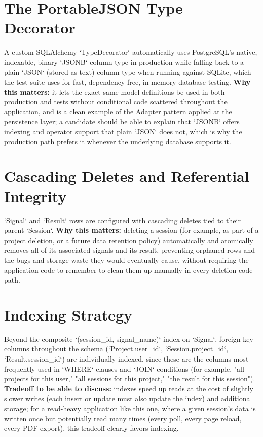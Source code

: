 \documentclass[11pt,a4paper]{report}
\begin{document}
\section{The PortableJSON Type Decorator}

A custom SQLAlchemy `TypeDecorator` automatically uses PostgreSQL's native, indexable, binary `JSONB` column type in production while falling back to a plain `JSON` (stored as text) column type when running against SQLite, which the test suite uses for fast, dependency free, in-memory database testing. \textbf{Why this matters:} it lets the exact same model definitions be used in both production and tests without conditional code scattered throughout the application, and is a clean example of the Adapter pattern applied at the persistence layer; a candidate should be able to explain that `JSONB` offers indexing and operator support that plain `JSON` does not, which is why the production path prefers it whenever the underlying database supports it.

\section{Cascading Deletes and Referential Integrity}

`Signal` and `Result` rows are configured with cascading deletes tied to their parent `Session`. \textbf{Why this matters:} deleting a session (for example, as part of a project deletion, or a future data retention policy) automatically and atomically removes all of its associated signals and its result, preventing orphaned rows and the bugs and storage waste they would eventually cause, without requiring the application code to remember to clean them up manually in every deletion code path.

\section{Indexing Strategy}

Beyond the composite `(session_id, signal_name)` index on `Signal`, foreign key columns throughout the schema (`Project.user_id`, `Session.project_id`, `Result.session_id`) are individually indexed, since these are the columns most frequently used in `WHERE` clauses and `JOIN` conditions (for example, "all projects for this user," "all sessions for this project," "the result for this session"). \textbf{Tradeoff to be able to discuss:} indexes speed up reads at the cost of slightly slower writes (each insert or update must also update the index) and additional storage; for a read-heavy application like this one, where a given session's data is written once but potentially read many times (every poll, every page reload, every PDF export), this tradeoff clearly favors indexing.
\end{document}
